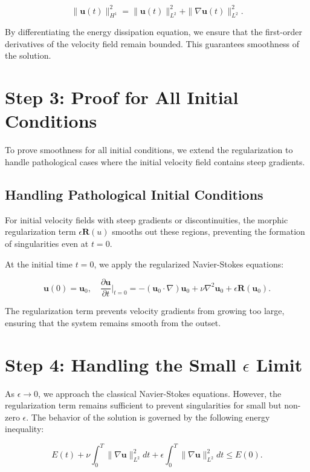 \documentclass{article}
\begin{document}
\[
\|\mathbf{u}(t)\|_{H^1}^2 = \|\mathbf{u}(t)\|_{L^2}^2 + \|\nabla \mathbf{u}(t)\|_{L^2}^2.
\]

By differentiating the energy dissipation equation, we ensure that the first-order derivatives of the velocity field remain bounded. This guarantees smoothness of the solution.

\section*{Step 3: Proof for All Initial Conditions}

To prove smoothness for all initial conditions, we extend the regularization to handle pathological cases where the initial velocity field contains steep gradients.

\subsection*{Handling Pathological Initial Conditions}

For initial velocity fields with steep gradients or discontinuities, the morphic regularization term \( \epsilon \mathbf{R}(u) \) smooths out these regions, preventing the formation of singularities even at \( t = 0 \).

At the initial time \( t = 0 \), we apply the regularized Navier-Stokes equations:

\[
\mathbf{u}(0) = \mathbf{u}_0, \quad \frac{\partial \mathbf{u}}{\partial t}\Big|_{t=0} = -(\mathbf{u}_0 \cdot \nabla)\mathbf{u}_0 + \nu \nabla^2 \mathbf{u}_0 + \epsilon \mathbf{R}(\mathbf{u}_0).
\]

The regularization term prevents velocity gradients from growing too large, ensuring that the system remains smooth from the outset.

\section*{Step 4: Handling the Small \( \epsilon \) Limit}

As \( \epsilon \to 0 \), we approach the classical Navier-Stokes equations. However, the regularization term remains sufficient to prevent singularities for small but non-zero \( \epsilon \). The behavior of the solution is governed by the following energy inequality:

\[
E(t) + \nu \int_0^T \|\nabla \mathbf{u}\|_{L^2}^2 dt + \epsilon \int_0^T \|\nabla \mathbf{u}\|_{L^2}^2 dt \leq E(0).
\]
\end{document}
